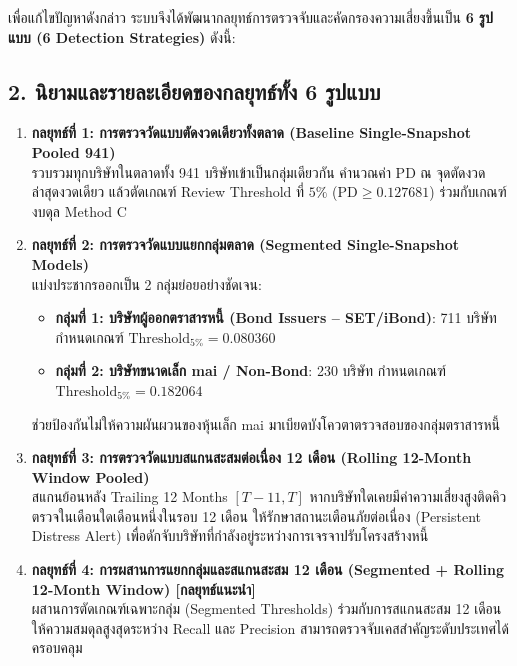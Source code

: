 \documentclass[11pt,a4paper]{article}
\begin{document}
เพื่อแก้ไขปัญหาดังกล่าว ระบบจึงได้พัฒนากลยุทธ์การตรวจจับและคัดกรองความเสี่ยงขึ้นเป็น \textbf{6 รูปแบบ (6 Detection Strategies)} ดังนี้:

\subsection{2. นิยามและรายละเอียดของกลยุทธ์ทั้ง 6 รูปแบบ}

\begin{enumerate}[leftmargin=1.5em]
  \item \textbf{กลยุทธ์ที่ 1: การตรวจวัดแบบตัดงวดเดียวทั้งตลาด (Baseline Single-Snapshot Pooled 941)} \\
  รวบรวมทุกบริษัทในตลาดทั้ง 941 บริษัทเข้าเป็นกลุ่มเดียวกัน คำนวณค่า PD ณ จุดตัดงวดล่าสุดงวดเดียว แล้วตัดเกณฑ์ Review Threshold ที่ $5\%$ ($\text{PD} \ge 0.127681$) ร่วมกับเกณฑ์งบดุล Method C
  
  \item \textbf{กลยุทธ์ที่ 2: การตรวจวัดแบบแยกกลุ่มตลาด (Segmented Single-Snapshot Models)} \\
  แบ่งประชากรออกเป็น 2 กลุ่มย่อยอย่างชัดเจน:
  \begin{itemize}
    \item \textbf{กลุ่มที่ 1: บริษัทผู้ออกตราสารหนี้ (Bond Issuers -- SET/iBond)}: 711 บริษัท กำหนดเกณฑ์ $\text{Threshold}_{5\%} = 0.080360$
    \item \textbf{กลุ่มที่ 2: บริษัทขนาดเล็ก mai / Non-Bond}: 230 บริษัท กำหนดเกณฑ์ $\text{Threshold}_{5\%} = 0.182064$
  \end{itemize}
  ช่วยป้องกันไม่ให้ความผันผวนของหุ้นเล็ก mai มาเบียดบังโควตาตรวจสอบของกลุ่มตราสารหนี้
  
  \item \textbf{กลยุทธ์ที่ 3: การตรวจวัดแบบสแกนสะสมต่อเนื่อง 12 เดือน (Rolling 12-Month Window Pooled)} \\
  สแกนย้อนหลัง Trailing 12 Months $[T-11, T]$ หากบริษัทใดเคยมีค่าความเสี่ยงสูงติดคิวตรวจในเดือนใดเดือนหนึ่งในรอบ 12 เดือน ให้รักษาสถานะเตือนภัยต่อเนื่อง (Persistent Distress Alert) เพื่อดักจับบริษัทที่กำลังอยู่ระหว่างการเจรจาปรับโครงสร้างหนี้
  
  \item \textbf{กลยุทธ์ที่ 4: การผสานการแยกกลุ่มและสแกนสะสม 12 เดือน (Segmented + Rolling 12-Month Window) [กลยุทธ์แนะนำ]} \\
  ผสานการตัดเกณฑ์เฉพาะกลุ่ม (Segmented Thresholds) ร่วมกับการสแกนสะสม 12 เดือน ให้ความสมดุลสูงสุดระหว่าง Recall และ Precision สามารถตรวจจับเคสสำคัญระดับประเทศได้ครอบคลุม
  

\end{enumerate}
\end{document}
